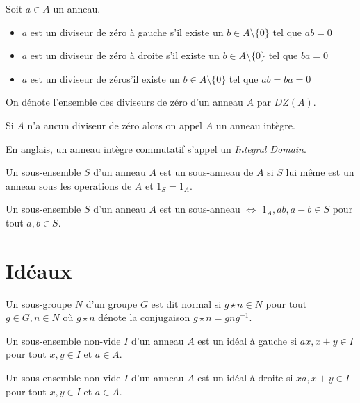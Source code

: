 \begin{defn}
\label{def:ring-div0}
Soit $a\in A$ un anneau.

\begin{itemize}
\item $a$ est un diviseur de zéro à gauche s'il existe un $b\in A\setminus\{0\}$ tel que $ab=0$
\item $a$ est un diviseur de zéro à droite s'il existe un $b\in A\setminus\{0\}$ tel que $ba=0$
\item $a$ est un diviseur de zéros'il existe un $b\in A\setminus\{0\}$ tel que $ab=ba=0$
\end{itemize}

On dénote l'ensemble des diviseurs de zéro d'un anneau $A$ par $DZ(A)$.

Si $A$ n'a aucun diviseur de zéro alors on appel $A$ un anneau intègre.
\end{defn}

\begin{rmrk}
En anglais, un anneau intègre commutatif s'appel un \textit{Integral Domain}.
\end{rmrk}

\begin{defn}
Un sous-ensemble  $S$ d'un anneau $A$ est un sous-anneau de $A$ si $S$ lui même est un anneau sous les operations de $A$ et $1_S=1_A$.
\end{defn}

\begin{thm}
Un sous-ensemble $S$ d'un anneau $A$ est un sous-anneau $\iff$ $1_A,ab, a-b\in S$ pour tout $a,b\in S$.
\end{thm}

\section{Idéaux}
\label{sec:ideal}
\begin{rmrk}
Un sous-groupe $N$ d'un groupe $G$ est dit normal si $g\star n\in N$ pour tout $g\in G,n\in N$ où $g\star n$ dénote la  conjugaison $g\star n=gng^{-1}$.
\end{rmrk}

\begin{defn}
Un sous-ensemble non-vide $I$  d'un anneau $A$ est un idéal à gauche si $ax,x+y\in I$ pour tout $x,y\in I$ et $a\in A$.

Un sous-ensemble non-vide $I$  d'un anneau $A$ est un idéal à droite si $xa,x+y\in I$ pour tout $x,y\in I$ et $a\in A$.
\end{defn}

